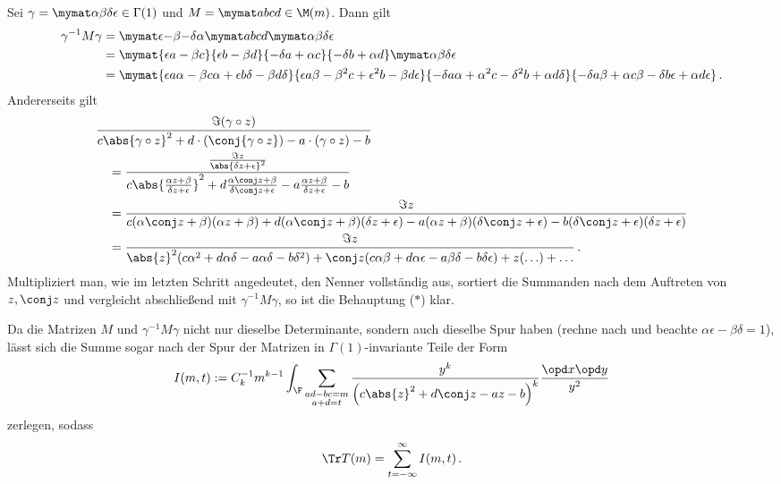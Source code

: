 \begin{bewe}
Sei $\gamma = \mymat \alpha \beta \delta \epsilon \in \Gamma(1)$ und $M = \mymat abcd \in \M(m)$. Dann gilt
\begin{align*}
	\gamma^{-1} M \gamma &= \mymat \epsilon {-\beta} {-\delta} \alpha \mymat abcd \mymat \alpha \beta \delta \epsilon \\
	&= \mymat {\epsilon a - \beta c} {\epsilon b - \beta d} {-\delta a + \alpha c} {- \delta b + \alpha d} \mymat \alpha \beta \delta \epsilon \\
	&= \mymat {\epsilon a \alpha - \beta c \alpha + \epsilon b \delta - \beta d \delta} {\epsilon a \beta - \beta^2 c + \epsilon^2 b - \beta d \epsilon} {-\delta a \alpha + \alpha^2 c - \delta^2 b + \alpha d \delta} {-\delta a \beta + \alpha c \beta - \delta b \epsilon + \alpha d \epsilon}
	\,.
\end{align*}
Andererseits gilt 
\begin{align*}
	& \frac {\Im(\gamma \circ z)} {c \abs {\gamma \circ z}^2 + d \cdot \left( \conj{\gamma \circ z} \right) - a \cdot \left( \gamma \circ z \right) - b} \\
	&\quad = \frac {\frac {\Im z} {\abs{\delta z + \epsilon}^2}} {c \abs {\frac{\alpha z + \beta}{\delta z + \epsilon}}^2 + d \frac{\alpha \conj z + \beta}{\delta \conj z + \epsilon} - a \frac{\alpha z + \beta}{\delta z + \epsilon} - b} \\
	&\quad = \frac {\Im z} {c(\alpha \conj z + \beta) (\alpha z + \beta) + d(\alpha \conj z + \beta)(\delta z + \epsilon) - a (\alpha z + \beta)(\delta \conj z + \epsilon) -b (\delta \conj z + \epsilon)(\delta z + \epsilon)} \\
	&\quad = \frac {\Im z} {\abs{z}^2 (c\alpha^2 + d \alpha \delta - a \alpha \delta - b \delta^2) + \conj z (c \alpha \beta + d \alpha \epsilon - a \beta \delta - b \delta \epsilon) + z (\ldots) + \ldots}
	\,.
\end{align*}
Multipliziert man, wie im letzten Schritt angedeutet, den Nenner vollständig aus, sortiert die Summanden nach dem Auftreten von $z, \conj z$ und vergleicht abschließend mit $\gamma^{-1} M \gamma$, so ist die Behauptung ($\ast$) klar.


Da die Matrizen $M$ und $\gamma^{-1} M \gamma$ nicht nur dieselbe Determinante, sondern auch dieselbe Spur haben (rechne nach und beachte $\alpha \epsilon - \beta \delta = 1$), lässt sich die Summe sogar nach der Spur der Matrizen in $\Gamma(1)$-invariante Teile der Form
\[
	I(m,t) := C_k^{-1} m^{k-1} \int_\F \sum_{\substack{ad-bc = m\\a+d = t}} \frac{y^k}{\left(c \abs{z}^2 + d \conj z - az - b\right)^k} \frac{\opd x \opd y}{y^2}
\]
zerlegen, sodass
\[
	\Tr T(m) = \sum_{t = -\infty}^\infty I(m,t)
	\,.
\]


\end{bewe}
